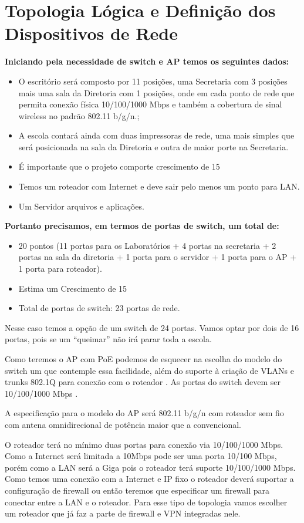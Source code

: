 \documentclass[	DIV=calc,%
							paper=a4,%
							fontsize=12pt,%
							onecolumn]{scrartcl}	 					%
\begin{document}
\section{Topologia Lógica e Definição dos Dispositivos de Rede}
{              
	
\textbf{Iniciando pela necessidade de switch e AP temos os seguintes dados:} 
\begin{itemize}
	\item O escritório será composto por 11 posições, uma Secretaria com 3 posições mais uma sala da       Diretoria com 1 posições, onde em cada ponto de rede que permita conexão física 10/100/1000 Mbps e também a cobertura de sinal wireless no padrão 802.11 b/g/n.;
	\item A escola  contará ainda com duas impressoras de rede, uma mais simples que será posicionada na sala da Diretoria  e outra de maior porte na Secretaria.
	\item É importante que o projeto comporte crescimento de 15%
	\item Temos um roteador com Internet e deve sair pelo menos um ponto para LAN.
	\item Um Servidor arquivos e aplicações.
\end{itemize}
	
	
\textbf{Portanto precisamos, em termos de portas de switch, um total de:}

\begin{itemize}
	\item 20 pontos (11 portas para os Laboratórios + 4 portas na secretaria + 2 portas na sala da diretoria + 1 porta para o servidor + 1 porta para o AP + 1 porta para roteador).
	\item Estima um Crescimento de 15%
	\item Total de portas de switch: 23 portas de rede.
\end{itemize}	
	

Nesse caso temos a opção de um switch de 24 portas. Vamos optar por dois de 16 portas, pois se um “queimar” não irá parar toda a escola.
	
Como teremos o AP com PoE  podemos de esquecer na escolha do modelo do switch um que contemple essa facilidade, além do suporte à criação de VLANs e trunks 802.1Q para conexão com o roteador . As portas do switch devem ser 10/100/1000 Mbps .
	
A especificação para o modelo do AP será 802.11 b/g/n com roteador sem fio com antena omnidirecional de potência maior que a convencional. 
	
O roteador terá no mínimo duas portas para conexão via 10/100/1000 Mbps. Como a Internet será limitada a 10Mbps pode ser uma porta 10/100 Mbps, porém como a LAN será a Giga pois o roteador terá suporte 10/100/1000 Mbps. Como temos uma conexão com a Internet e IP fixo o roteador deverá suportar a configuração de firewall ou então teremos que especificar um firewall para conectar entre a LAN e o roteador. Para esse tipo de topologia vamos escolher um roteador que já faz a parte de firewall e VPN integradas nele.}
\end{document}
